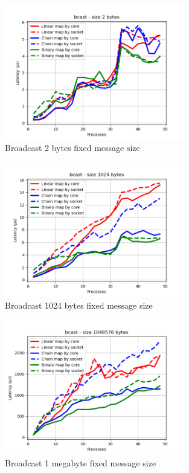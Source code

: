 \begin{figure}[h!]
    \centering
    \includegraphics[width=0.7\textwidth]{../plots/bcast_fixedSize2.png}
    \caption{Broadcast 2 bytes fixed message size}
    \label{fig:broadcast_fixed_message_size_2}
\end{figure}

\begin{figure}[h!]
    \centering
    \includegraphics[width=0.7\textwidth]{../plots/bcast_fixedSize1024.png}
    \caption{Broadcast 1024 bytes fixed message size}
    \label{fig:broadcast_fixed_message_size_1024}
\end{figure}

\begin{figure}[h!]
    \centering
    \includegraphics[width=0.7\textwidth]{../plots/bcast_fixedSize1048576.png}
    \caption{Broadcast 1 megabyte fixed message size}
    \label{fig:broadcast_fixed_message_size_1048576}
\end{figure}

